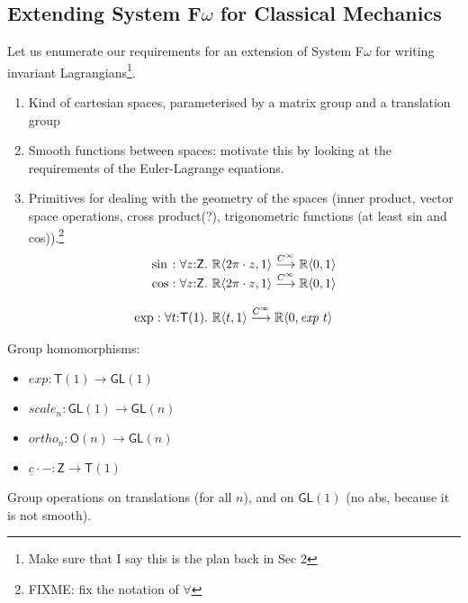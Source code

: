 \documentclass[preprint]{sigplanconf}
\newcommand{\smoothrightarrow}{\stackrel{C^\infty}\longrightarrow}
\theoremstyle{examplestyle}
\begin{document}
\subsection{Extending System F$\omega$ for Classical Mechanics}

Let us enumerate our requirements for an extension of System F$\omega$
for writing invariant Lagrangians\footnote{Make sure that I say this
  is the plan back in Sec 2}.

\begin{enumerate}
\item Kind of cartesian spaces, parameterised by a matrix group and a
  translation group
\item Smooth functions between spaces: motivate this by looking at the
  requirements of the Euler-Lagrange equations.
\item Primitives for dealing with the geometry of the spaces (inner
  product, vector space operations, cross product(?), trigonometric
  functions (at least sin and cos)).\footnote{FIXME: fix the notation of $\forall$}
  \begin{displaymath}
    \begin{array}{l@{\hspace{0.3em}}c@{\hspace{0.3em}}l}
      \sin &:& \forall z \mathord: \mathsf{Z}.~\mathbb{R}\langle 2\pi \cdot z, 1 \rangle \smoothrightarrow \mathbb{R} \langle 0, 1 \rangle \\
      \cos &:& \forall z \mathord: \mathsf{Z}.~\mathbb{R}\langle 2\pi \cdot z, 1 \rangle \smoothrightarrow \mathbb{R} \langle 0, 1 \rangle \\
    \end{array}
  \end{displaymath}
\end{enumerate}

\begin{displaymath}
  \begin{array}{l@{\hspace{0.3em}}c@{\hspace{0.3em}}l}
    \mathrm{exp} &:& \forall t \mathord: \mathsf{T}(1).~\mathbb{R}\langle t, 1 \rangle \smoothrightarrow \mathbb{R}\langle 0, \mathit{exp}~t \rangle
  \end{array}
\end{displaymath}

Group homomorphisms:
\begin{itemize}
\item $\mathit{exp} : \mathsf{T}(1) \to \mathsf{GL}(1)$
\item $\mathit{scale}_n : \mathsf{GL}(1) \to \mathsf{GL}(n)$
\item $\mathit{ortho}_n : \mathsf{O}(n) \to \mathsf{GL}(n)$
\item $\underline{c}\cdot- : \mathsf{Z} \to \mathsf{T}(1)$
\end{itemize}
Group operations on translations (for all $n$), and on
$\mathsf{GL}(1)$ (no abs, because it is not smooth).
\end{document}
